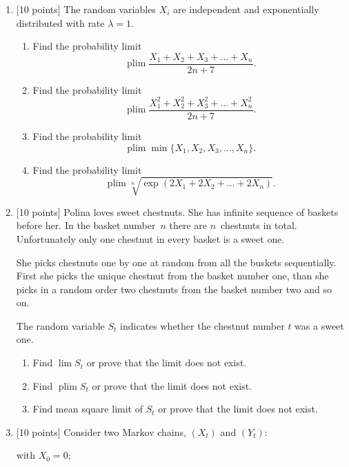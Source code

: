 \documentclass[12pt]{article}
\DeclareMathOperator{\plim}{plim}
\begin{document}
\begin{enumerate}

\item {[10 points]} The random variables $X_i$ are independent and exponentially distributed with rate $\lambda = 1$. 

\begin{enumerate}
    \item Find the probability limit
    \[
    \plim \frac{X_1 + X_2 + X_3 + \dots + X_n}{2n + 7}.
    \]
    \item Find the probability limit
    \[
    \plim \frac{X_1^2 + X_2^2 + X_3^2 + \dots + X_n^2}{2n + 7}.
    \]
    \item Find the probability limit
    \[
        \plim \min\{X_1, X_2, X_3, \dots, X_n\}.
    \]
    \item Find the probability limit
    \[
    \plim \sqrt[n]{\exp(2X_1 + 2X_2 + \dots + 2X_n)}.
    \]
\end{enumerate}



\item {[10 points]} Polina loves sweet chestnuts. 
She has infinite sequence of baskets before her.
In the basket number~$n$ there are $n$~chestnuts in total.
Unfortunately only one chestnut in every basket is a sweet one. 

She picks chestnuts one by one at random from all the buskets sequentially. 
First she picks the unique chestnut from the basket number one, 
than she picks in a random order two chestnuts from the basket number two and so on. 

The random variable $S_t$ indicates whether the chestnut number $t$ was a sweet one. 

\begin{enumerate}
  \item Find $\lim S_t$ or prove that the limit does not exist.
  \item Find $\plim S_t$ or prove that the limit does not exist.
  \item Find mean square limit of $S_t$ or prove that the limit does not exist. 
\end{enumerate}

\item {[10 points]} Consider two Markov chains, $(X_t)$ and $(Y_t)$: 

 with $X_0 = 0$;


\end{enumerate}
\end{document}
